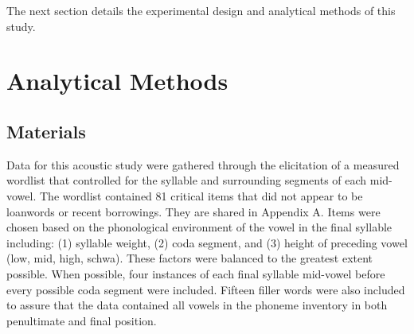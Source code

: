 \documentclass[12pt]{ouparticle}
\begin{document}
The next section details the experimental design and analytical methods of this study.


\section{Analytical Methods}\label{sec:methods}

\subsection{Materials}\label{sec:materials}

Data for this acoustic study were gathered through the elicitation of a measured wordlist that controlled for the syllable and surrounding segments of each mid-vowel. The wordlist contained 81 critical items that did not appear to be loanwords or recent borrowings. They are shared in Appendix A. Items were chosen based on the phonological environment of the vowel in the final syllable including: (1) syllable weight, (2) coda segment, and (3) height of preceding vowel (low, mid, high, schwa). These factors were balanced to the greatest extent possible. When possible, four instances of each final syllable mid-vowel before every possible coda segment were included. Fifteen filler words were also included to assure that the data contained all vowels in the phoneme inventory in both penultimate and final position.

\newpage


\end{document}
